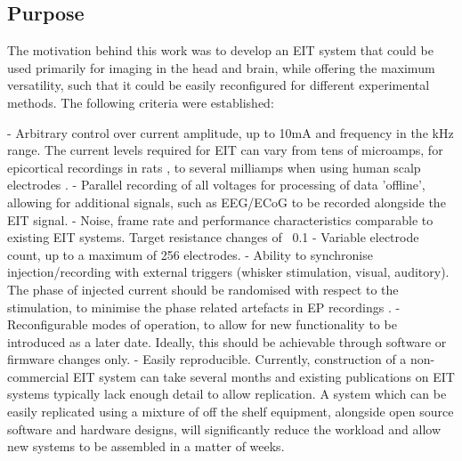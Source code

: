 \subsection{Purpose}

The motivation behind this work was to develop an EIT system that could be used primarily for imaging in the head and brain, while offering the maximum versatility, such that it could be easily reconfigured for different experimental methods. The following criteria were established:

- Arbitrary control over current amplitude, up to 10mA and frequency in the kHz range. The current levels required for EIT can vary from tens of microamps, for epicortical recordings in rats \cite{Oh2011}, to several milliamps when using human scalp electrodes \cite{tidswell2001three}. 
- Parallel recording of all voltages for processing of data 'offline', allowing for additional signals, such as EEG/ECoG to be recorded alongside the EIT signal.
- Noise, frame rate and performance characteristics comparable to existing EIT systems. Target resistance changes of ~0.1%
- Variable electrode count, up to a maximum of 256 electrodes.
- Ability to synchronise injection/recording with external triggers (whisker stimulation, visual, auditory). The phase of injected current should be randomised with respect to the stimulation, to minimise the phase related artefacts in EP recordings \cite{Aristovich_2015}.
- Reconfigurable modes of operation, to allow for new functionality to be introduced as a later date. Ideally, this should be achievable  through software or firmware changes only.
- Easily reproducible. Currently, construction of a non-commercial EIT system can take several months and existing publications on EIT systems typically lack enough detail to allow replication. A system which can be easily replicated using a mixture of off the shelf equipment, alongside open source software and hardware designs, will significantly reduce the workload and allow new systems to be assembled in a matter of weeks.
